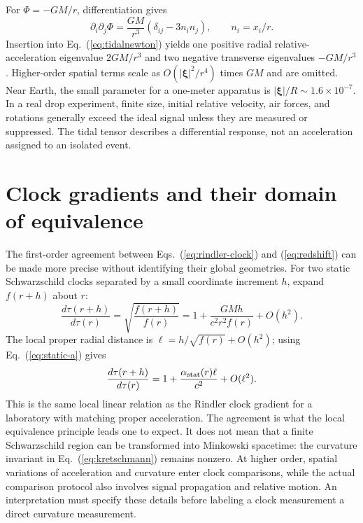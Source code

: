\documentclass[11pt,letterpaper]{article}
\begin{document}
For $\Phi=-GM/r$, differentiation gives
\begin{equation}
 \partial_i\partial_j\Phi
 =\frac{GM}{r^3}\left(\delta_{ij}-3n_i n_j\right),
 \qquad n_i=x_i/r.
\end{equation}
Insertion into Eq.~(\ref{eq:tidalnewton}) yields one positive radial relative-acceleration eigenvalue $2GM/r^3$ and two negative transverse eigenvalues $-GM/r^3$. Higher-order spatial terms scale as $O(|\bm\xi|^2/r^4)$ times $GM$ and are omitted. Near Earth, the small parameter for a one-meter apparatus is $|\bm\xi|/R\sim1.6\times10^{-7}$. In a real drop experiment, finite size, initial relative velocity, air forces, and rotations generally exceed the ideal signal unless they are measured or suppressed. The tidal tensor describes a differential response, not an acceleration assigned to an isolated event.

\section{Clock gradients and their domain of equivalence}

The first-order agreement between Eqs.~(\ref{eq:rindler-clock}) and (\ref{eq:redshift}) can be made more precise without identifying their global geometries. For two static Schwarzschild clocks separated by a small coordinate increment $h$, expand $f(r+h)$ about $r$:
\begin{equation}
 \frac{d\tau(r+h)}{d\tau(r)}
 =\sqrt{\frac{f(r+h)}{f(r)}}
 =1+\frac{GMh}{c^2r^2f(r)}+O(h^2).
\end{equation}
The local proper radial distance is $\ell=h/\sqrt{f(r)}+O(h^2)$; using Eq.~(\ref{eq:static-a}) gives
\begin{equation}
 \frac{d\tau(r+h)}{d\tau(r)}
 =1+\frac{\alpha_{\rm stat}(r)\ell}{c^2}+O(\ell^2).
\end{equation}
This is the same local linear relation as the Rindler clock gradient for a laboratory with matching proper acceleration. The agreement is what the local equivalence principle leads one to expect. It does not mean that a finite Schwarzschild region can be transformed into Minkowski spacetime: the curvature invariant in Eq.~(\ref{eq:kretschmann}) remains nonzero. At higher order, spatial variations of acceleration and curvature enter clock comparisons, while the actual comparison protocol also involves signal propagation and relative motion. An interpretation must specify these details before labeling a clock measurement a direct curvature measurement.
\end{document}
